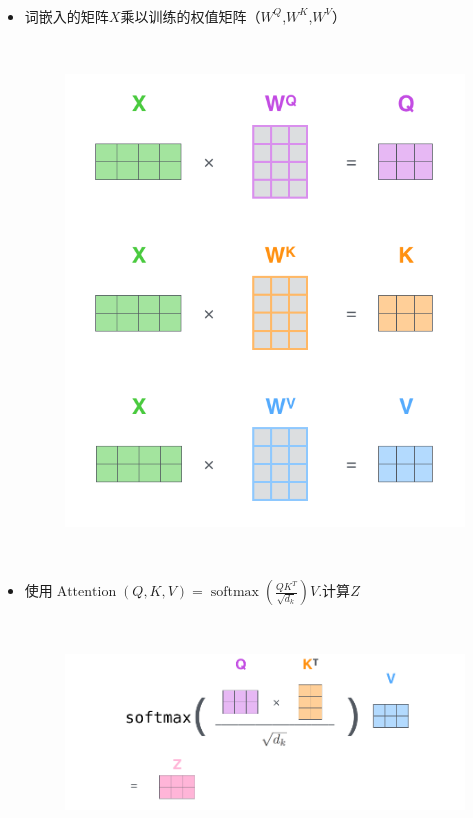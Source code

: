 \documentclass[10pt,t,handout]{beamer}
\begin{document}
\begin{frame}

\

{ }
\

\
\
	\begin{itemize}
	\item<1-> 词嵌入的矩阵$X$乘以训练的权值矩阵（$W^{Q}$,$W^{K}$,$W^{V}$）
	
	\ 
	\begin{figure}[!t]
		\centering
		\includegraphics[scale=0.12]{111.png}
		\label{figure3_OT}
	\end{figure}
\

	\item<2-> 使用$\operatorname{Attention}(Q, K, V)=\operatorname{softmax}\left(\frac{Q K^{T}}{\sqrt{d_{k}}}\right) V$.计算$Z$
	\
	
	\
		\begin{figure}[!t]
		\centering
		\includegraphics[scale=0.14]{1111.png}
		\label{figurOT}
	\end{figure}
	\end{itemize}
\end{frame}
\end{document}
